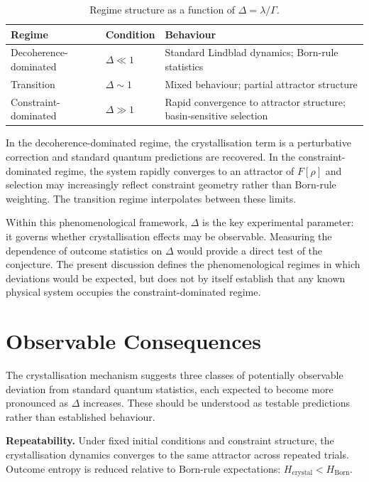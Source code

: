 \documentclass[12pt]{article}
\begin{document}
\begin{table}[ht]
\centering
\caption{Regime structure as a function of $\Delta = \lambda/\Gamma$.}
\label{tab:regimes}
\begin{tabular}{@{}lll@{}}
\toprule
Regime & Condition & Behaviour \\
\midrule
Decoherence-dominated & $\Delta \ll 1$ & Standard Lindblad dynamics; Born-rule statistics \\
Transition & $\Delta \sim 1$ & Mixed behaviour; partial attractor structure \\
Constraint-dominated & $\Delta \gg 1$ & Rapid convergence to attractor structure; basin-sensitive selection \\
\bottomrule
\end{tabular}
\end{table}

In the decoherence-dominated regime, the crystallisation term is a perturbative correction and standard quantum predictions are recovered. In the constraint-dominated regime, the system rapidly converges to an attractor of $F[\rho]$ and selection may increasingly reflect constraint geometry rather than Born-rule weighting. The transition regime interpolates between these limits.

Within this phenomenological framework, $\Delta$ is the key experimental parameter: it governs whether crystallisation effects may be observable. Measuring the dependence of outcome statistics on $\Delta$ would provide a direct test of the conjecture. The present discussion defines the phenomenological regimes in which deviations would be expected, but does not by itself establish that any known physical system occupies the constraint-dominated regime.

\section{Observable Consequences}\label{sec:observables}

The crystallisation mechanism suggests three classes of potentially observable deviation from standard quantum statistics, each expected to become more pronounced as $\Delta$ increases. These should be understood as testable predictions rather than established behaviour.

\textbf{Repeatability.} Under fixed initial conditions and constraint structure, the crystallisation dynamics converges to the same attractor across repeated trials. Outcome entropy is reduced relative to Born-rule expectations: $H_{\mathrm{crystal}} < H_{\mathrm{Born}}$.
\end{document}
